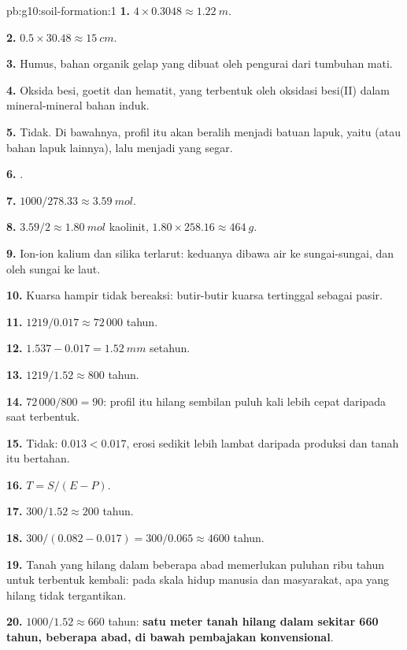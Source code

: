 \begin{solution}{pb:g10:soil-formation:1}
\textbf{1.} $4 \times 0.3048 \approx \qty{1.22}{m}$.

\textbf{2.} $0.5 \times 30.48 \approx \qty{15}{cm}$.

\textbf{3.} Humus, bahan organik gelap yang dibuat oleh pengurai dari
tumbuhan mati.

\textbf{4.} Oksida besi, goetit dan hematit, yang terbentuk oleh oksidasi
besi(II) dalam mineral-mineral bahan induk.

\textbf{5.} Tidak. Di bawahnya, profil itu akan beralih menjadi batuan lapuk,
yaitu  (atau bahan lapuk lainnya), lalu menjadi  yang
segar.

\textbf{6.} .

\textbf{7.} $1000/278.33 \approx \qty{3.59}{mol}$.

\textbf{8.} $3.59/2 \approx \qty{1.80}{mol}$ kaolinit, $1.80 \times 258.16
\approx \qty{464}{g}$.

\textbf{9.} Ion-ion kalium dan silika terlarut: keduanya dibawa air ke
sungai-sungai, dan oleh sungai ke laut.

\textbf{10.} Kuarsa hampir tidak bereaksi: butir-butir kuarsa tertinggal sebagai pasir.

\textbf{11.} $1219/0.017 \approx 72\,000$ tahun.

\textbf{12.} $1.537 - 0.017 = \qty{1.52}{mm}$ setahun.

\textbf{13.} $1219/1.52 \approx 800$ tahun.

\textbf{14.} $72\,000/800 = 90$: profil itu hilang sembilan puluh kali lebih
cepat daripada saat terbentuk.

\textbf{15.} Tidak: $0.013 < 0.017$, erosi sedikit lebih lambat daripada
produksi dan tanah itu bertahan.

\textbf{16.} $T = S/(E - P)$.

\textbf{17.} $300/1.52 \approx 200$ tahun.

\textbf{18.} $300/(0.082 - 0.017) = 300/0.065 \approx 4600$ tahun.

\textbf{19.} Tanah yang hilang dalam beberapa abad memerlukan puluhan ribu
tahun untuk terbentuk kembali: pada skala hidup manusia dan masyarakat, apa
yang hilang tidak tergantikan.

\textbf{20.} $1000/1.52 \approx 660$ tahun: \textbf{satu meter tanah hilang
dalam sekitar 660 tahun, beberapa abad, di bawah pembajakan konvensional}.
\end{solution}
